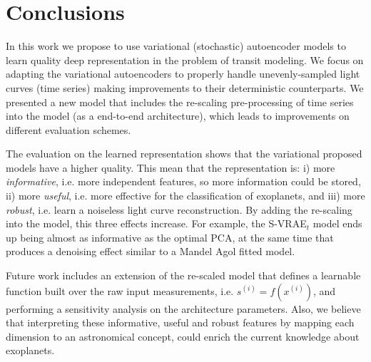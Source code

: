 \section{Conclusions}
\label{concl}

In this work we propose to use variational (stochastic) autoencoder models to learn quality deep representation in the problem of transit modeling. 
We focus on adapting the variational autoencoders to properly handle unevenly-sampled light curves (time series) making improvements to their deterministic counterparts.
We presented a new model that includes the re-scaling pre-processing of time series into the model (as a end-to-end architecture), which leads to improvements on different evaluation schemes.

The evaluation on the learned representation shows that the variational proposed models have a higher quality. This mean that the representation is: i) more \textit{informative}, i.e. more independent features, so more information could be stored, ii) more \textit{useful}, i.e. more effective for the classification of exoplanets, and iii) more \textit{robust}, i.e. learn a noiseless light curve reconstruction.
By adding the re-scaling into the model, this three effects increase. For example, the S-VRAE$_t$ model ends up being almost as informative as the optimal PCA, at the same time that produces a denoising effect similar to a Mandel Agol fitted model.

Future work includes an extension of the re-scaled model that defines a learnable function built over the raw input measurements, i.e. $s^{(i)}= f(x^{(i)})$, and performing a sensitivity analysis on the architecture parameters. Also, we believe that interpreting these informative, useful and robust features by mapping each dimension to an astronomical concept, could enrich the current knowledge about exoplanets.
